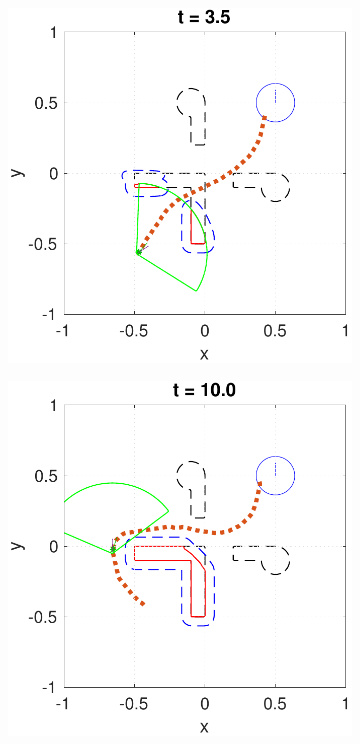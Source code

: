\begin{figure}
  \centering
  \begin{subfigure}[t]{0.49\columnwidth}
    \includegraphics[width=\columnwidth]{fig/P5D_Dubins/36}
  \end{subfigure}
  \begin{subfigure}[t]{0.49\columnwidth}
    \includegraphics[width=\columnwidth]{fig/P5D_Dubins/101}
  \end{subfigure}  
  

\end{figure}
